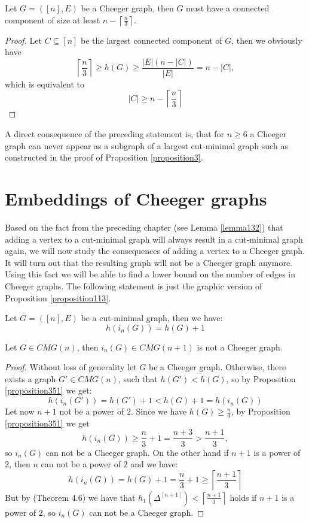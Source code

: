 \begin{prop}
Let \(G=([n],E)\) be a Cheeger graph, then \(G\) must have a connected component of size at least \(n-\left\lceil\frac{n}{3}\right\rceil\).
\begin{proof}
Let \(C\subseteq [n]\) be the largest connected component of \(G\), then we obviously have
\[
\left\lceil\frac{n}{3}\right\rceil\geq h(G)\geq \frac{|E|(n-|C|)}{|E|}=n-|C|,
\]
which is equivalent to
\[
|C|\geq n-\left\lceil\frac{n}{3}\right\rceil
\]
\end{proof}
\end{prop}

A direct consequence of the preceding statement is, that for \(n\geq 6\) a Cheeger graph can never appear as a subgraph of a largest cut-minimal graph such as constructed in the proof of Proposition \ref{proposition3}.



\section{Embeddings of Cheeger graphs}

Based on the fact from the preceding chapter (see Lemma \ref{lemma132}) that adding a vertex to a cut-minimal graph will always result in a cut-minimal graph again, we will now study the consequences of adding a vertex to a Cheeger graph. It will turn out that the resulting graph will not be a Cheeger graph anymore. Using this fact we will be able to find a lower bound on the number of edges in Cheeger graphs. The following statement is just the graphic version of Proposition \ref{proposition113}.

\begin{prop}\label{proposition351}
Let \(G=([n],E)\) be a cut-minimal graph, then we have:
\[
h(i_n(G))=h(G)+1
\]
\end{prop}

\begin{prop}\label{proposition352}
Let \(G\in CMG(n)\), then \(i_n(G)\in CMG(n+1)\) is not a Cheeger graph.
\begin{proof}
Without loss of generality let \(G\) be a Cheeger graph. Otherwise, there exists a graph \(G'\in CMG(n)\), such that \(h(G')<h(G)\), so by Proposition \ref{proposition351} we get:
\[
h(i_n(G'))=h(G')+1<h(G)+1=h(i_n(G))
\]
Let now \(n+1\) not be a power of \(2\). Since we have \(h(G)\geq\frac{n}{3}\), by Proposition \ref{proposition351} we get
\[
h(i_n(G))\geq\frac{n}{3}+1=\frac{n+3}{3}>\frac{n+1}{3},
\]
so \(i_n(G)\) can not be a Cheeger graph. On the other hand if \(n+1\) is a power of \(2\), then \(n\) can not be a power of \(2\) and we have:
\[
h(i_n(G))=h(G)+1=\frac{n}{3}+1\geq\left\lceil\frac{n+1}{3}\right\rceil
\]
But by \cite{1} (Theorem 4.6) we have that \(h_1(\Delta^{[n+1]})<\left\lceil\frac{n+1}{3}\right\rceil\) holds if \(n+1\) is a power of \(2\), so \(i_n(G)\) can not be a Cheeger graph.
\end{proof}
\end{prop}

